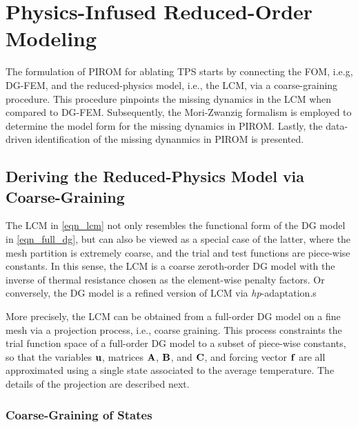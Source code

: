 \section{Physics-Infused Reduced-Order Modeling}\label{sec_pirom}

The formulation of PIROM for ablating TPS starts by connecting the FOM, i.e.g, DG-FEM, and the reduced-physics model, i.e., the LCM, via a coarse-graining procedure. This procedure pinpoints the missing dynamics in the LCM when compared to DG-FEM. Subsequently, the Mori-Zwanzig formalism is employed to determine the model form for the missing dynamics in PIROM. Lastly, the data-driven identification of the missing dynanmics in PIROM is presented.

\subsection{Deriving the Reduced-Physics Model via Coarse-Graining}

The LCM in \cref{eqn_lcm} not only resembles the functional form of the DG model in \cref{eqn_full_dg}, but can also be viewed as a special case of the latter, where the mesh partition is extremely coarse, and the trial and test functions are piece-wise constants. In this sense, the LCM is a coarse zeroth-order DG model with the inverse of thermal resistance chosen as the element-wise penalty factors. Or conversely, the DG model is a refined version of LCM via \textit{hp}-adaptation.s

More precisely, the LCM can be obtained from a full-order DG model on a fine mesh via a projection process, i.e., coarse graining. This process constraints the trial function space of a full-order DG model to a subset of piece-wise constants, so that the variables $\mathbf{u}$, matrices $\mathbf{A}$, $\mathbf{B}$, and $\mathbf{C}$, and forcing vector $\mathbf{f}$ are all approximated using a single state associated to the average temperature. The details of the projection are described next.

\subsubsection{Coarse-Graining of States}



